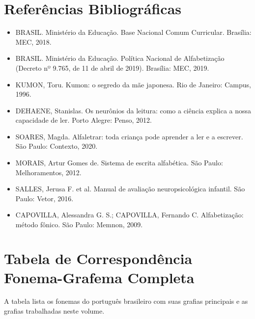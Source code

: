 
\chapter{Referências Bibliográficas}

\begin{itemize}[leftmargin=1.6em]
  \item BRASIL. Ministério da Educação. Base Nacional Comum Curricular. Brasília: MEC, 2018.
  \item BRASIL. Ministério da Educação. Política Nacional de Alfabetização (Decreto nº 9.765, de 11 de abril de 2019). Brasília: MEC, 2019.
  \item KUMON, Toru. Kumon: o segredo da mãe japonesa. Rio de Janeiro: Campus, 1996.
  \item DEHAENE, Stanislas. Os neurônios da leitura: como a ciência explica a nossa capacidade de ler. Porto Alegre: Penso, 2012.
  \item SOARES, Magda. Alfaletrar: toda criança pode aprender a ler e a escrever. São Paulo: Contexto, 2020.
  \item MORAIS, Artur Gomes de. Sistema de escrita alfabética. São Paulo: Melhoramentos, 2012.
  \item SALLES, Jerusa F. et al. Manual de avaliação neuropsicológica infantil. São Paulo: Vetor, 2016.
  \item CAPOVILLA, Alessandra G. S.; CAPOVILLA, Fernando C. Alfabetização: método fônico. São Paulo: Memnon, 2009.
\end{itemize}

\chapter{Tabela de Correspondência Fonema-Grafema Completa}

A tabela lista os fonemas do português brasileiro com suas grafias principais e as grafias trabalhadas neste volume.

